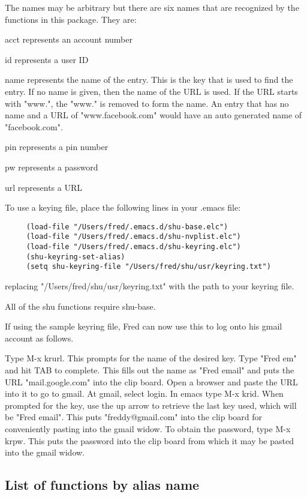 The names may be arbitrary but there are six names that are recognized by the
functions in this package.  They are:

acct represents an account number

id represents a user ID

name represents the name of the entry.  This is the key that is used to find
the entry.  If no name is given, then the name of the URL is used.  If the URL
starts with "www.", the "www." is removed to form the name.  An entry that has
no name and a URL of "www.facebook.com" would have an auto generated name of
"facebook.com".

pin represents a pin number

pw represents a password

url represents a URL

To use a keying file, place the following lines in your .emacs file:

\small{\begin{verbatim}
     (load-file "/Users/fred/.emacs.d/shu-base.elc")
     (load-file "/Users/fred/.emacs.d/shu-nvplist.elc")
     (load-file "/Users/fred/.emacs.d/shu-keyring.elc")
     (shu-keyring-set-alias)
     (setq shu-keyring-file "/Users/fred/shu/usr/keyring.txt")
\end{verbatim}}

replacing "/Users/fred/shu/usr/keyring.txt" with the path to your keyring file.

All of the shu functions require shu-base.

If using the sample keyring file, Fred can now use this to log onto his gmail
account as follows.

Type M-x krurl.  This prompts for the name of the desired key.  Type "Fred em"
and hit TAB to complete.  This fills out the name as "Fred email" and puts the
URL "mail.google.com" into the clip board.  Open a browser and paste the URL
into it to go to gmail.  At gmail, select login.  In emacs type M-x krid.
When prompted for the key, use the up arrow to retrieve the last key used,
which will be "Fred email".  This puts "freddy@gmail.com" into the clip board
for conveniently pasting into the gmail widow.  To obtain the password, type
M-x krpw.  This puts the password into the clip board from which it may be
pasted into the gmail widow.


\subsection{List of functions by alias name}

